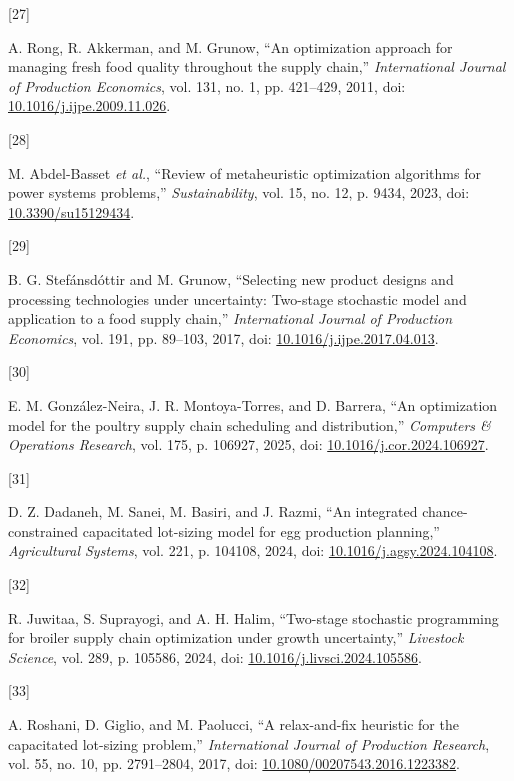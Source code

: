 \documentclass[
  spanish,
  12pt,
]{article}
\newlength{\cslhangindent}
\newlength{\csllabelwidth}
\newenvironment{CSLReferences}[2] %
 {\begin{list}{}{%
  \setlength{\itemindent}{0pt}
  \setlength{\leftmargin}{0pt}
  \setlength{\parsep}{0pt}
  \ifodd #1
   \setlength{\leftmargin}{\cslhangindent}
   \setlength{\itemindent}{-1\cslhangindent}
  \fi
  \setlength{\itemsep}{#2\baselineskip}}}
 {\end{list}}
\newcommand{\CSLLeftMargin}[1]{\parbox[t]{\csllabelwidth}{\strut#1\strut}}
\newcommand{\CSLRightInline}[1]{\parbox[t]{\linewidth - \csllabelwidth}{\strut#1\strut}}
\begin{document}
\begin{CSLReferences}{0}{0}
\CSLLeftMargin{{[}27{]} }%
\CSLRightInline{A. Rong, R. Akkerman, and M. Grunow, {``An optimization
approach for managing fresh food quality throughout the supply chain,''}
\emph{International Journal of Production Economics}, vol. 131, no. 1,
pp. 421--429, 2011, doi:
\href{https://doi.org/10.1016/j.ijpe.2009.11.026}{10.1016/j.ijpe.2009.11.026}.}

\CSLLeftMargin{{[}28{]} }%
\CSLRightInline{M. Abdel-Basset \emph{et al.}, {``Review of
metaheuristic optimization algorithms for power systems problems,''}
\emph{Sustainability}, vol. 15, no. 12, p. 9434, 2023, doi:
\href{https://doi.org/10.3390/su15129434}{10.3390/su15129434}.}

\CSLLeftMargin{{[}29{]} }%
\CSLRightInline{B. G. Stefánsdóttir and M. Grunow, {``Selecting new
product designs and processing technologies under uncertainty: Two-stage
stochastic model and application to a food supply chain,''}
\emph{International Journal of Production Economics}, vol. 191, pp.
89--103, 2017, doi:
\href{https://doi.org/10.1016/j.ijpe.2017.04.013}{10.1016/j.ijpe.2017.04.013}.}

\CSLLeftMargin{{[}30{]} }%
\CSLRightInline{E. M. González-Neira, J. R. Montoya-Torres, and D.
Barrera, {``An optimization model for the poultry supply chain
scheduling and distribution,''} \emph{Computers \& Operations Research},
vol. 175, p. 106927, 2025, doi:
\href{https://doi.org/10.1016/j.cor.2024.106927}{10.1016/j.cor.2024.106927}.}

\CSLLeftMargin{{[}31{]} }%
\CSLRightInline{D. Z. Dadaneh, M. Sanei, M. Basiri, and J. Razmi, {``An
integrated chance-constrained capacitated lot-sizing model for egg
production planning,''} \emph{Agricultural Systems}, vol. 221, p.
104108, 2024, doi:
\href{https://doi.org/10.1016/j.agsy.2024.104108}{10.1016/j.agsy.2024.104108}.}

\CSLLeftMargin{{[}32{]} }%
\CSLRightInline{R. Juwitaa, S. Suprayogi, and A. H. Halim, {``Two-stage
stochastic programming for broiler supply chain optimization under
growth uncertainty,''} \emph{Livestock Science}, vol. 289, p. 105586,
2024, doi:
\href{https://doi.org/10.1016/j.livsci.2024.105586}{10.1016/j.livsci.2024.105586}.}

\CSLLeftMargin{{[}33{]} }%
\CSLRightInline{A. Roshani, D. Giglio, and M. Paolucci, {``A
relax-and-fix heuristic for the capacitated lot-sizing problem,''}
\emph{International Journal of Production Research}, vol. 55, no. 10,
pp. 2791--2804, 2017, doi:
\href{https://doi.org/10.1080/00207543.2016.1223382}{10.1080/00207543.2016.1223382}.}


\end{CSLReferences}
\end{document}
